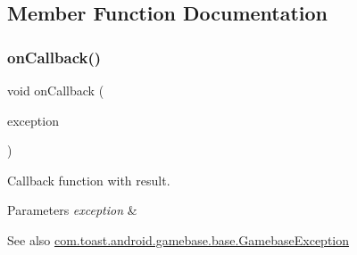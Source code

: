 \subsection{Member Function Documentation}
\mbox{\label{interfacecom_1_1toast_1_1android_1_1gamebase_1_1_gamebase_callback_a810f2920c5b907c7667a4f097b7c6dca}} 
\subsubsection{\texorpdfstring{on\+Callback()}{onCallback()}}
{\footnotesize\ttfamily void on\+Callback (\begin{DoxyParamCaption}\item[{\hyperlink{classcom_1_1toast_1_1android_1_1gamebase_1_1base_1_1_gamebase_exception}{Gamebase\+Exception}}]{exception }\end{DoxyParamCaption})}



Callback function with result. 


\begin{DoxyParams}{Parameters}
{\em exception} & \\
\hline
\end{DoxyParams}
\begin{DoxySeeAlso}{See also}
\hyperlink{classcom_1_1toast_1_1android_1_1gamebase_1_1base_1_1_gamebase_exception}{com.\+toast.\+android.\+gamebase.\+base.\+Gamebase\+Exception} 
\end{DoxySeeAlso}
